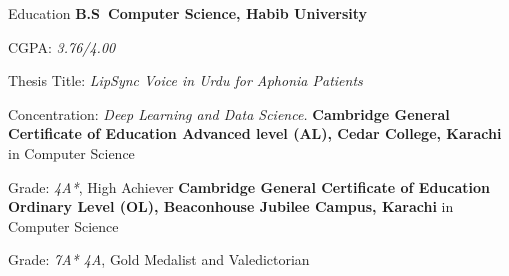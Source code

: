 \begin{rubric}{Education}
\entry*[2020 -- Present]%
	\textbf{B.S~Computer Science, Habib University}\par
        CGPA: \emph{3.76/4.00} \par
        Thesis Title: \emph{LipSync Voice in Urdu for Aphonia Patients}
        \par Concentration: \emph{Deep Learning and Data Science.}
\entry*[2018 -- 2020]%
	\textbf{Cambridge General Certificate of Education Advanced level (AL), Cedar College, Karachi} in Computer Science
	\par Grade: \emph{4A*}, High Achiever
\entry*[2015 -- 2018]%
	\textbf{Cambridge General Certificate of Education Ordinary Level (OL), Beaconhouse Jubilee Campus, Karachi} in Computer Science
	\par Grade: \emph{7A* 4A}, Gold Medalist and Valedictorian

% 
\end{rubric}